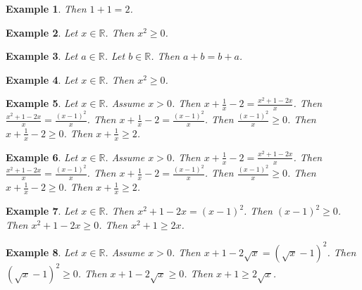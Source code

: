 \documentclass[12pt]{article}
\newtheorem{example}{Example}
\begin{document}

\begin{example}
    Then $1+1=2$.
\end{example}

\begin{example}
    Let $x\in\mathbb{R}$. Then $x^2\ge 0$.
\end{example}

\begin{example}
    Let $a\in\mathbb{R}$. Let $b\in\mathbb{R}$. Then $a+b=b+a$.
\end{example}

\begin{example}
    Let $x\in\mathbb{R}$. Then $x^2 \ge 0$.
\end{example}

\begin{example}
    Let $x\in\mathbb{R}$. Assume $x>0$. Then $x + \frac{1}{x} - 2 = \frac{x^2 + 1 - 2x}{x}$.
    Then $\frac{x^2 + 1 - 2x}{x} = \frac{{(x-1)}^2}{x}$.
    Then $x + \frac{1}{x} - 2 = \frac{{(x-1)}^2}{x}$.
    Then $\frac{{(x-1)}^2}{x} \ge 0$.
    Then $x + \frac{1}{x} - 2 \ge 0$.
    Then $x + \frac{1}{x} \ge 2$.
\end{example}
\begin{example}
    Let $x\in\mathbb{R}$. Assume $x>0$. Then $x + \frac{1}{x} - 2 = \frac{x^2 + 1 - 2x}{x}$.
    Then $\frac{x^2 + 1 - 2x}{x} = \frac{{(x-1)}^2}{x}$.
    Then $x + \frac{1}{x} - 2 = \frac{{(x-1)}^2}{x}$.
    Then $\frac{{(x-1)}^2}{x} \ge 0$.
    Then $x + \frac{1}{x} - 2 \ge 0$.
    Then $x + \frac{1}{x} \ge 2$.
\end{example}



\begin{example}
    Let $x\in\mathbb{R}$. Then $x^2 + 1 - 2x = {(x-1)}^2$. Then ${(x-1)}^2 \ge 0$. Then $x^2 + 1 - 2x \ge 0$. Then $x^2 + 1 \ge 2x$.
\end{example}

\begin{example}
    Let $x\in\mathbb{R}$. Assume $x > 0$. Then $x + 1 - 2\sqrt{x} = {(\sqrt{x}-1)}^2$. Then ${(\sqrt{x}-1)}^2 \ge 0$. Then $x + 1 - 2\sqrt{x} \ge 0$. Then $x + 1 \ge 2\sqrt{x}$.
\end{example}
\end{document}
